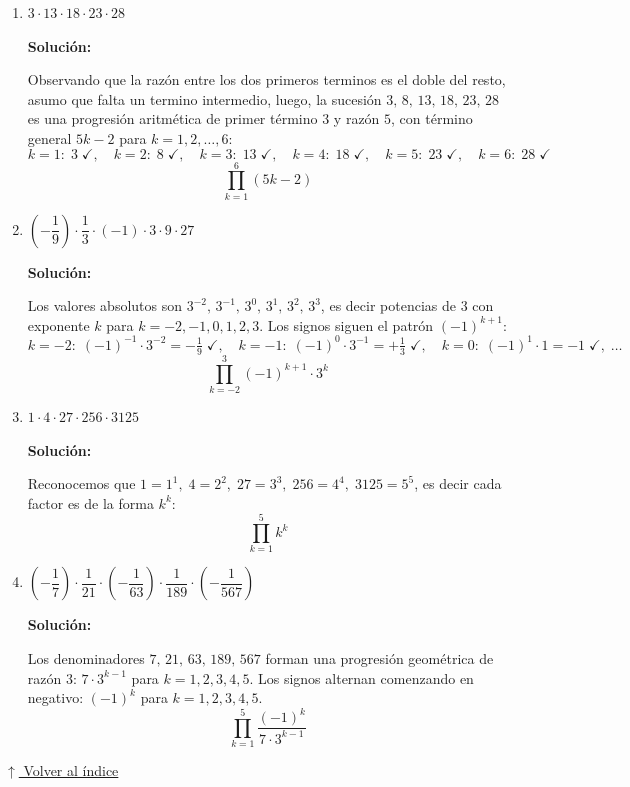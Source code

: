 \documentclass[12pt]{article}
\newcommand{\solucion}{%
    \vspace{0.8em}%
    \textbf{Solución:}%
}
\newcommand{\volverindice}{%
    \vspace{1em}%
    \begin{flushright}%
        \hyperlink{indice}{\small $\uparrow$ Volver al índice}%
    \end{flushright}%
}
\begin{document}
\begin{enumerate}[label=\alph*.-]
    \item $3 \cdot 13 \cdot 18 \cdot 23 \cdot 28$

    \solucion

    Observando que la razón entre los dos primeros terminos es el doble del resto, asumo que falta un termino intermedio, luego, la sucesión $3,\,8,\,13,\,18,\,23,\,28$ es una progresión aritmética de primer término $3$ y razón $5$, con término general $5k-2$ para $k=1,2,\ldots,6$:
    \[
    k=1:\;3\;\checkmark,\quad k=2:\;8\;\checkmark,\quad k=3:\;13\;\checkmark,\quad
    k=4:\;18\;\checkmark,\quad k=5:\;23\;\checkmark,\quad k=6:\;28\;\checkmark
    \]
    \[
    \prod_{k=1}^{6}(5k-2)
    \]

    \item $\left(-\dfrac{1}{9}\right)\cdot\dfrac{1}{3}\cdot(-1)\cdot3\cdot9\cdot27$

    \solucion

    Los valores absolutos son $3^{-2},\,3^{-1},\,3^{0},\,3^{1},\,3^{2},\,3^{3}$,
    es decir potencias de $3$ con exponente $k$ para $k=-2,-1,0,1,2,3$.
    Los signos siguen el patrón $(-1)^{k+1}$:
    \[
    k=-2:\;(-1)^{-1}\cdot3^{-2}=-\tfrac{1}{9}\;\checkmark,\quad
    k=-1:\;(-1)^{0}\cdot3^{-1}=+\tfrac{1}{3}\;\checkmark,\quad
    k=0:\;(-1)^{1}\cdot1=-1\;\checkmark,\;\ldots
    \]
    \[
    \prod_{k=-2}^{3}(-1)^{k+1}\cdot 3^{k}
    \]

    \item $1\cdot4\cdot27\cdot256\cdot3125$

    \solucion

    Reconocemos que $1=1^1,\;4=2^2,\;27=3^3,\;256=4^4,\;3125=5^5$,
    es decir cada factor es de la forma $k^k$:
    \[
    \prod_{k=1}^{5}k^{k}
    \]

    \newpage
    \item $\left(-\dfrac{1}{7}\right)\cdot\dfrac{1}{21}\cdot\left(-\dfrac{1}{63}\right)\cdot\dfrac{1}{189}\cdot\left(-\dfrac{1}{567}\right)$

    \solucion

    Los denominadores $7,\,21,\,63,\,189,\,567$ forman una progresión geométrica de razón $3$:
    $7\cdot3^{k-1}$ para $k=1,2,3,4,5$.
    Los signos alternan comenzando en negativo: $(-1)^{k}$ para $k=1,2,3,4,5$.
    \[
    \prod_{k=1}^{5}\dfrac{(-1)^{k}}{7\cdot3^{k-1}}
    \]

\end{enumerate}

\volverindice
\end{document}
